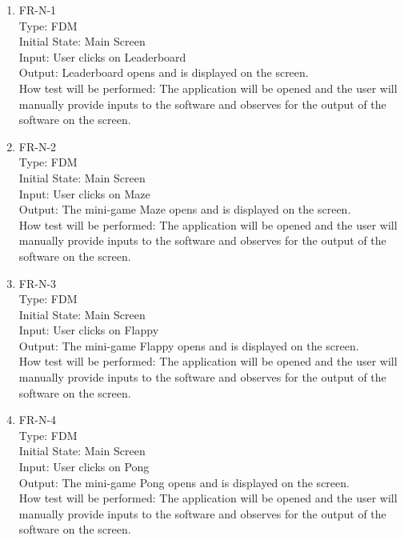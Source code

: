\documentclass[12pt, titlepage]{article}
\begin{document}
\begin{enumerate}

\item{FR-N-1\\}
Type: FDM\\
Initial State: Main Screen\\
Input: User clicks on Leaderboard\\
Output: Leaderboard opens and is displayed on the screen.\\
How test will be performed: The application will be opened and the user will manually provide inputs to the software and observes for the output of the software on the screen.\\

\item{FR-N-2\\}
Type: FDM\\
Initial State: Main Screen\\
Input: User clicks on Maze\\
Output: The mini-game Maze opens and is displayed on the screen.\\
How test will be performed: The application will be opened and the user will manually provide inputs to the software and observes for the output of the software on the screen.\\

\item{FR-N-3\\}
Type: FDM\\
Initial State: Main Screen\\
Input: User clicks on Flappy\\
Output: The mini-game Flappy opens and is displayed on the screen.\\
How test will be performed: The application will be opened and the user will manually provide inputs to the software and observes for the output of the software on the screen.\\

\item{FR-N-4\\}
Type: FDM\\
Initial State: Main Screen\\
Input: User clicks on Pong\\
Output: The mini-game Pong opens and is displayed on the screen.\\
How test will be performed: The application will be opened and the user will manually provide inputs to the software and observes for the output of the software on the screen.\\


\end{enumerate}
\end{document}
